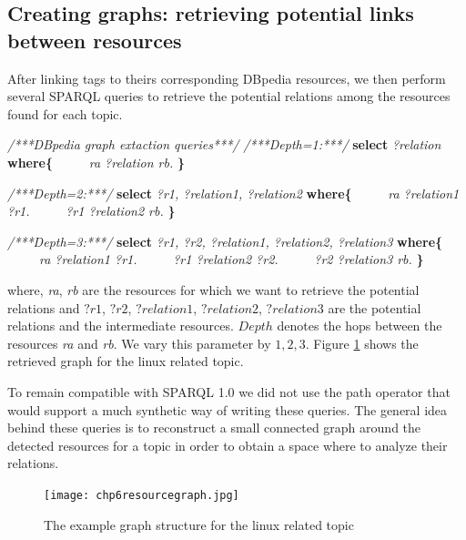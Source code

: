 \subsection{Creating graphs: retrieving potential links between resources}
After linking tags to theirs corresponding DBpedia resources, we then perform several SPARQL queries to retrieve the potential relations among the resources found for each topic. 


\begin{algorithm}%
\begin{algorithmic}[1]
\label{algo:dbpediaquery}
\State \textit{/***DBpedia graph extaction queries***/}
\State \textit{/***Depth=1:***/}
\State \textbf{select} \textit{?relation}
\State \textbf{where\{}
\State \ \ \ \ \ \textit{ra ?relation rb.}
\State \textbf{\}}

\State \textit{/***Depth=2:***/}
\State \textbf{select}  \textit{?r1, ?relation1, ?relation2} 
\State \textbf{where\{} 
\State \ \ \ \ \ \textit{ra ?relation1 ?r1.}
\State \ \ \ \ \ \textit{?r1 ?relation2 rb.} 
\State \textbf{\}} 

\State \textit{/***Depth=3:***/}
\State \textbf{select}  \textit{?r1, ?r2, ?relation1, ?relation2, ?relation3} 
\State \textbf{where\{} 
\State \ \ \ \ \ \textit{ra ?relation1 ?r1.}
\State \ \ \ \ \ \textit{?r1 ?relation2 ?r2.}
\State \ \ \ \ \ \textit{?r2 ?relation3 rb.} 
\State \textbf{\}} 
\end{algorithmic}
\end{algorithm}

where, \textit{ra}, \textit{rb} are the resources for which we want to retrieve the potential relations and $?r1$, $?r2$, $?relation1$, $?relation2$, $?relation3$ are the potential relations and the intermediate resources. $Depth$ denotes the hops between the resources \textit{ra} and \textit{rb}. We vary this parameter by $1,2,3$. Figure \ref{fig:chp6resourcegraph} shows the retrieved graph for the linux related topic.

To remain compatible with SPARQL 1.0 we did not use the path operator that would support a much synthetic way of writing these queries. The general idea behind these queries is to reconstruct a small connected graph around the detected resources for a topic in order to obtain a space where to analyze their relations.

\begin{figure}[htp]
\centering
\texttt{[image: chp6resourcegraph.jpg]}  
\caption{The example graph structure for the linux related topic}
\label{fig:chp6resourcegraph} 
\end{figure}

